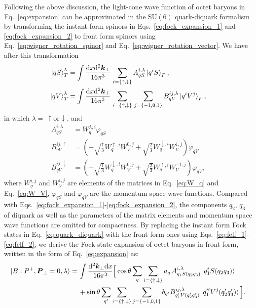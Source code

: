 \documentclass[aps,prc,preprint,groupedaddress,showpacs,superscriptaddress,floatfix]{revtex4-1}
\newcommand{\diff}{\ensuremath\mathrm{d}}
\renewcommand{\vec}[1]{\ensuremath\boldsymbol{#1}}
\newcommand{\udarrow}{\ensuremath{{\uparrow,\downarrow}}}
\begin{document}
Following the above discussion, the light-cone wave function of octet baryons in Eq.~\eqref{eq:expansion} can be approximated in the $\mathrm{SU}(6)$ quark-diquark formalism by transforming the instant form spinors in Eqs.~\eqref{eq:fock_expansion_1} and \eqref{eq:fock_expansion_2} to front form spinors using Eq.~\eqref{eq:wigner_rotation_spinor} and Eq.~\eqref{eq:wigner_rotation_vector}.
We have after this transformation
%
\begin{align}
  \ket{qS}_T^\lambda &= \int\frac{\diff x \diff^2 \vec{k}_{\perp}}{16\pi^3 }\,
  \sum_{i=\{\udarrow\}}A^{i,\lambda}_{qS}\ket{q^i S}_F, \label{eq:felf_1} \\
  \ket{qV}_T^\lambda &= \int\frac{\diff x \diff^2 \vec{k}_{\perp}}{16\pi^3 }\,
  \sum_{i=\{\udarrow\}}\,\sum_{j=\{-1,0,1\}} B^{ij,\lambda}_{qV} \ket{q^i V^j}_F, \label{eq:felf_2}
\end{align}
%
in which $\lambda=\,\uparrow \mbox{or} \downarrow$, and
%
\begin{align}
  A^{i,\lambda}_{qS} &= W_{q}^{\lambda,i} \varphi_{qS}\\
  B^{ij,\uparrow}_{qV} &= \left( -\sqrt{\frac{1}{3}} W_{q}^{\uparrow,i} W_{V}^{0,j}
  + \sqrt{\frac{2}{3}} W_{q}^{\downarrow,i} W_{V}^{1,j} \right) \varphi_{qV}\\
  B^{ij,\downarrow}_{qV} &= \left( -\sqrt{\frac{1}{3}} W_{q}^{\downarrow,i} W_{V}^{0,j}
  + \sqrt{\frac{2}{3}} W_{q}^{\uparrow,i} W_{V}^{-1,j} \right) \varphi_{qV},
\end{align}
%
where $W_{q}^{i,j}$ and $W_{V}^{i,j}$ are elements of the matrices in Eq.~\eqref{eq:W_q} and Eq.~\eqref{eq:W_V}, $\varphi_{qS}$ and $\varphi_{qV}$ are the momentum space wave functions.
Compared with Eqs.~\eqref{eq:fock_expansion_1}-\eqref{eq:fock_expansion_2}, the components $q_2$, $q_3$ of diquark as well as the parameters of the matrix elements and momentum space wave functions are omitted for compactness.
By replacing the instant form Fock states in Eq.~\eqref{eq:quark_diquark} with the front form ones using Eqs.~\eqref{eq:felf_1}-\eqref{eq:felf_2}, we derive the Fock state expansion of octet baryons in front form, written in the form of Eq.~\eqref{eq:expansion} as:
%
\begin{align}
  \ket{B:P^+, \vec{P}_\perp = 0, \lambda} =&\,\int\frac{\diff^2 \vec{k}_\perp \diff x}{16\pi^3} 
  \Big[ \cos\theta \sum_q \sum_{i=\{\udarrow\}} a_q\,A^{i,\lambda}_{q_1S(q_2q_3)} \ket{q^i_1S(q_2q_3)} \nonumber\\
  &\,+ \sin\theta \sum_{q'} \sum_{i=\{\udarrow\}}\sum_{j=\{-1,0,1\}} b_{q'} B^{ij,\lambda}_{q'_1V(q'_2q'_3)} \ket{q'^i_1V^j(q'_2q'_3)} \Big].
\end{align}
\end{document}
